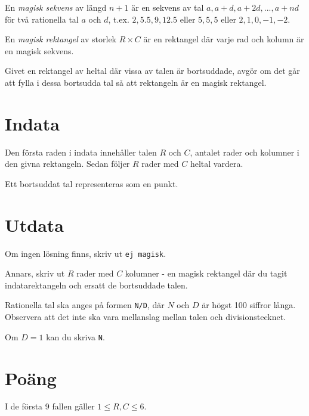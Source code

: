 
En \emph{magisk sekvens} av längd $n + 1$ är en sekvens av tal $a, a + d, a + 2d, ..., a + nd$ för två rationella tal $a$ och $d$, t.ex. $2, 5.5, 9, 12.5$ eller $5, 5, 5$ eller $2, 1, 0, -1, -2$.

En \emph{magisk rektangel} av storlek $R \times C$ är en rektangel där varje rad och kolumn är en magisk sekvens.

Givet en rektangel av heltal där vissa av talen är bortsuddade, avgör om det går att fylla i dessa bortsudda tal så att rektangeln är en magisk rektangel.

\section*{Indata}
Den första raden i indata innehåller talen $R$ och $C$, antalet rader och kolumner i den givna rektangeln. Sedan följer $R$ rader med $C$ heltal vardera.

Ett bortsuddat tal representeras som en punkt.

\section*{Utdata}
Om ingen lösning finns, skriv ut \texttt{ej magisk}.

Annars, skriv ut $R$ rader med $C$ kolumner - en magisk rektangel där du tagit indatarektangeln och ersatt de bortsuddade talen.

Rationella tal ska anges på formen \texttt{N/D}, där $N$ och $D$ är högst 100 siffror långa. Observera att det inte ska vara mellanslag mellan talen och divisionstecknet.

Om $D = 1$ kan du skriva \texttt{N}.

\section*{Poäng}

I de första 9 fallen gäller $1 \le R, C \le 6$.

